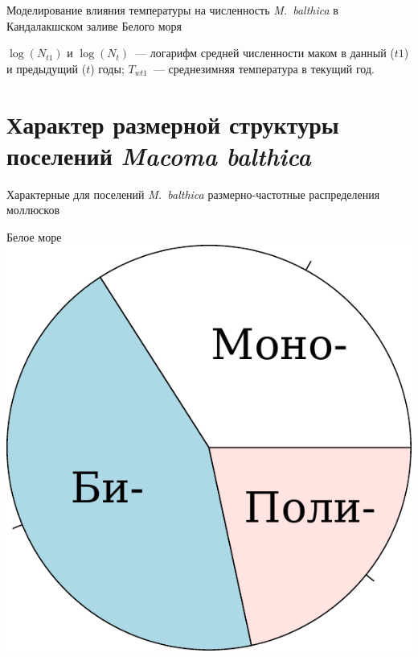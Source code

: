 \documentclass{beamer}
\begin{document}
\begin{frame}{Моделирование влияния температуры на численность {\it M.~balthica} в Кандалакшском заливе Белого моря}
\begin{minipage}[t]{.49\linewidth}
\begin{center}
		\end{center}
	\end{minipage}
{\tiny $\log(N_{t1})$ и $\log(N_{t})$~--- логарифм средней численности маком в данный ($t1$) и предыдущий ($t$) годы; $T_{wt1}$~--- среднезимняя температура в текущий год.}
\end{frame}

		\section[Размерная структура]{Характер размерной структуры поселений {\it Macoma balthica}}
\begin{frame}{Характерные для поселений {\it M.~balthica} размерно-частотные распределения моллюсков}
	\begin{minipage}[t]{.48\linewidth}
		\begin{center}
{\footnotesize Белое море}\\
			\includegraphics[height=.2\textheight]{White_freq_types.pdf}
		\end{center}
	\end{minipage}
%
	\begin{minipage}[t]{.48\linewidth}
		\begin{center}

\end{center}
\end{minipage}
\end{frame}
\end{document}
